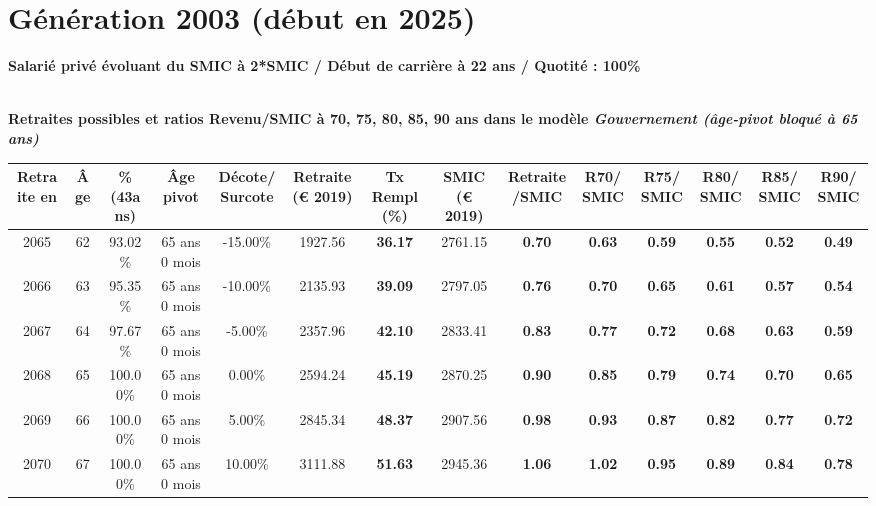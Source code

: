 \newpage 
 
\section{Génération 2003 (début en 2025)\label{Ascendant12_100_22_2003_0}} 
 
{\bf \noindent Salarié privé évoluant du SMIC à 2*SMIC / Début de carrière à 22 ans / Quotité : 100\%}  ~ 

 ~\\{\bf \noindent Retraites possibles et ratios Revenu/SMIC à 70, 75, 80, 85, 90 ans dans le modèle \emph{Gouvernement (âge-pivot bloqué à 65 ans)}}  
 
\begin{adjustbox}{max width=\textwidth} 
\begin{tabular}[htb]{|c|c||c|c|c||c|c||c|c||c|c|c|c|c|} 
\hline 
 Retraite en &  Âge &  \%(43ans) &  Âge pivot &  Décote/Surcote &  Retraite (\euro{} 2019) &  Tx Rempl(\%) &  SMIC (\euro{} 2019) &  Retraite/SMIC &  R70/SMIC &  R75/SMIC &  R80/SMIC &  R85/SMIC &  R90/SMIC \\ 
\hline \hline 
 2065 &  62 &  93.02\% &  65 ans 0 mois &  -15.00\% &  1927.56 &  {\bf 36.17} &  2761.15 &  {\bf {\color{red} 0.70}} &  {\bf {\color{red} 0.63}} &  {\bf {\color{red} 0.59}} &  {\bf {\color{red} 0.55}} &  {\bf {\color{red} 0.52}} &  {\bf {\color{red} 0.49}} \\ 
\hline 
 2066 &  63 &  95.35\% &  65 ans 0 mois &  -10.00\% &  2135.93 &  {\bf 39.09} &  2797.05 &  {\bf {\color{red} 0.76}} &  {\bf {\color{red} 0.70}} &  {\bf {\color{red} 0.65}} &  {\bf {\color{red} 0.61}} &  {\bf {\color{red} 0.57}} &  {\bf {\color{red} 0.54}} \\ 
\hline 
 2067 &  64 &  97.67\% &  65 ans 0 mois &  -5.00\% &  2357.96 &  {\bf 42.10} &  2833.41 &  {\bf {\color{red} 0.83}} &  {\bf {\color{red} 0.77}} &  {\bf {\color{red} 0.72}} &  {\bf {\color{red} 0.68}} &  {\bf {\color{red} 0.63}} &  {\bf {\color{red} 0.59}} \\ 
\hline 
 2068 &  65 &  100.00\% &  65 ans 0 mois &  0.00\% &  2594.24 &  {\bf 45.19} &  2870.25 &  {\bf {\color{red} 0.90}} &  {\bf {\color{red} 0.85}} &  {\bf {\color{red} 0.79}} &  {\bf {\color{red} 0.74}} &  {\bf {\color{red} 0.70}} &  {\bf {\color{red} 0.65}} \\ 
\hline 
 2069 &  66 &  100.00\% &  65 ans 0 mois &  5.00\% &  2845.34 &  {\bf 48.37} &  2907.56 &  {\bf {\color{red} 0.98}} &  {\bf {\color{red} 0.93}} &  {\bf {\color{red} 0.87}} &  {\bf {\color{red} 0.82}} &  {\bf {\color{red} 0.77}} &  {\bf {\color{red} 0.72}} \\ 
\hline 
 2070 &  67 &  100.00\% &  65 ans 0 mois &  10.00\% &  3111.88 &  {\bf 51.63} &  2945.36 &  {\bf 1.06} &  {\bf 1.02} &  {\bf {\color{red} 0.95}} &  {\bf {\color{red} 0.89}} &  {\bf {\color{red} 0.84}} &  {\bf {\color{red} 0.78}} \\ 
\hline 
\hline 
\end{tabular} 
\end{adjustbox} 
 
